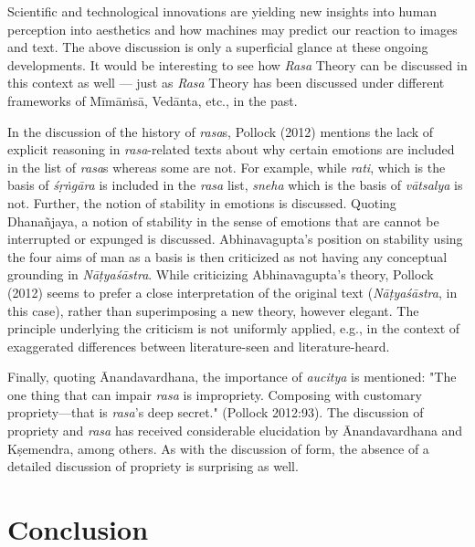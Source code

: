 Scientific and technological innovations are yielding new insights into human perception into aesthetics and how machines may predict our reaction to images and text. The above discussion is only a superficial glance at these ongoing developments. It would be interesting to see how \textsl{Rasa} Theory can be discussed in this context as well --- just as \textsl{Rasa} Theory has been discussed under different frameworks of Mīmāṁsā, Vedānta, etc., in the past. 

In the discussion of the history of \textsl{rasa}s, Pollock (2012) mentions the lack of explicit reasoning in \textsl{rasa}-related texts about why certain emotions are included in the list of \textsl{rasa}s whereas some are not. For example, while \textsl{rati}, which is the basis of \textsl{śṛṅgāra} is included in the \textsl{rasa} list, \textsl{sneha} which is the basis of \textsl{vātsalya} is not. Further, the notion of stability in emotions is discussed. Quoting Dhanañjaya, a notion of stability in the sense of emotions that are cannot be interrupted or expunged is discussed. Abhinavagupta’s position on stability using the four aims of man as a basis is then criticized as not having any conceptual grounding in \textsl{Nāṭyaśāstra}. While criticizing Abhinavagupta’s theory, Pollock (2012) seems to prefer a close interpretation of the original text (\textsl{Nāṭyaśāstra},
 in this case), rather than superimposing a new theory, however elegant. The principle underlying the criticism is not uniformly applied, e.g., in the context of exaggerated differences between literature-seen and literature-heard. 

Finally, quoting Ānandavardhana, the importance of \textsl{aucitya} is mentioned: "The one thing that can impair \textsl{rasa} is impropriety. Composing with customary propriety—that is \textsl{rasa}’s deep secret." (Pollock 2012:93). The discussion of propriety and \textsl{rasa} has received considerable elucidation by Ānandavardhana and Kṣemendra, among others. As with the discussion of form, the absence of a detailed discussion of propriety is surprising as well. 

\section*{Conclusion}

